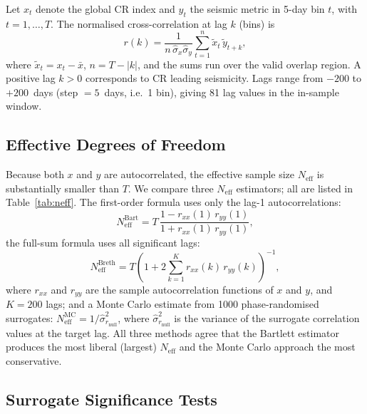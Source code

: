 \documentclass[12pt,a4paper]{article}
\begin{document}
Let $x_t$ denote the global CR index and $y_t$ the seismic metric in 5-day bin
$t$, with $t = 1, \ldots, T$.
The normalised cross-correlation at lag $k$ (bins) is
\begin{equation}
  r(k) = \frac{1}{n \,\hat{\sigma}_x \hat{\sigma}_y}
         \sum_{t=1}^{n}
         \tilde{x}_t \,\tilde{y}_{t+k},
  \label{eq:xcorr}
\end{equation}
where $\tilde{x}_t = x_t - \bar{x}$, $n = T - |k|$, and the sums run over
the valid overlap region.
A positive lag $k > 0$ corresponds to CR leading seismicity.
Lags range from $-200$ to $+200$~days (step $= 5$~days, i.e.\ 1 bin),
giving 81 lag values in the in-sample window.

\subsection{Effective Degrees of Freedom}
\label{sec:neff}

Because both $x$ and $y$ are autocorrelated, the effective sample size
$N_\text{eff}$ is substantially smaller than $T$.
We compare three $N_\text{eff}$ estimators; all are listed in Table~\ref{tab:neff}.
The \citet{Bartlett1946} first-order formula uses only the lag-1 autocorrelations:
\begin{equation}
  N_\text{eff}^\text{Bart} = T\,
    \frac{1 - r_{xx}(1)\,r_{yy}(1)}
         {1 + r_{xx}(1)\,r_{yy}(1)},
  \label{eq:neff_bartlett}
\end{equation}
the \citet{Bretherton1999} full-sum formula uses all significant lags:
\begin{equation}
  N_\text{eff}^\text{Breth} = T \left(
    1 + 2 \sum_{k=1}^{K} r_{xx}(k)\, r_{yy}(k)
  \right)^{-1},
  \label{eq:neff_breth}
\end{equation}
where $r_{xx}$ and $r_{yy}$ are the sample autocorrelation functions of $x$
and $y$, and $K = 200$ lags;
and a Monte Carlo estimate from 1000 phase-randomised surrogates:
$N_\text{eff}^\text{MC} = 1/\hat{\sigma}^2_{r_\text{null}}$,
where $\hat{\sigma}^2_{r_\text{null}}$ is the variance of the surrogate
correlation values at the target lag.
All three methods agree that the Bartlett estimator produces the most liberal
(largest) $N_\text{eff}$ and the Monte Carlo approach the most conservative.

\subsection{Surrogate Significance Tests}
\label{sec:surrogates}
\end{document}
